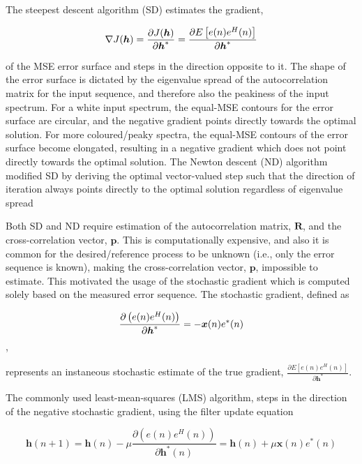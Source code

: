 The steepest descent algorithm (SD) estimates the gradient,

\begin{equation}
	\bold{\nabla} J(\boldsymbol{h}) = 
	\frac{\partial J(\boldsymbol{h})}{\partial \boldsymbol{h}^*} = \frac{\partial E\left[e(n)e^H(n)\right]}{\partial \boldsymbol{h}^*} \\
\end{equation}


\noindent
of the MSE error surface and steps in the direction opposite to it. The shape of the error surface is dictated by the eigenvalue spread of the autocorrelation matrix for the input sequence, and therefore also the peakiness of the input spectrum. For a white input spectrum, the equal-MSE contours for the error surface are circular, and the negative gradient points directly towards the optimal solution. For more coloured/peaky spectra, the equal-MSE contours of the error surface become elongated, resulting in a negative gradient which does not point directly towards the optimal solution. The Newton descent (ND) algorithm modified SD by deriving the optimal vector-valued step such that the direction of iteration always points directly to the optimal solution regardless of eigenvalue spread

Both SD and ND require estimation of the autocorrelation matrix, $\boldsymbol{R}$, and the cross-correlation vector, $\boldsymbol{p}$. This is computationally expensive, and also it is common for the desired/reference process to be unknown (i.e., only the error sequence is known), making the cross-correlation vector, $\boldsymbol{p}$, impossible to estimate. This motivated the usage of the stochastic gradient which is computed solely based on the measured error sequence. The stochastic gradient, defined as

\begin{equation}
	\frac{\partial \left(e(n)e^H(n)\right)}{\partial \boldsymbol{h}^*} = - \boldsymbol{x}(n)e^*(n) \\
\end{equation},

\noindent
represents an instaneous stochastic estimate of the true gradient, $ \frac{\partial E\left[e(n)e^H(n)\right]}{\partial \boldsymbol{h}^*} $.

The commonly used least-mean-squares (LMS) algorithm, steps in the direction of the negative stochastic gradient, using the filter update equation

\begin{equation}
	\boldsymbol{h}(n+1) =
	 \boldsymbol{h}(n) - \mu 	\frac{\partial \left(e(n)e^H(n)\right)}{\partial \boldsymbol{h}^*(n)} =
	 \boldsymbol{h}(n) + \mu \boldsymbol{x}(n)e^*(n)
\end{equation}


